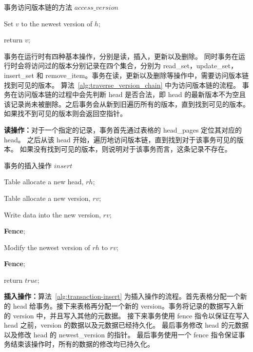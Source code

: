 \begin{algorithm}[ht]
    \caption{事务访问版本链的方法 $access\_version$}
    \label{alg:traverse_version_chain}
    \BlankLine

    Set $v$ to the newest version of $h$;


    return $v$;

\end{algorithm}

事务在运行时有四种基本操作，分别是读，插入，更新以及删除。
同时事务在运行时会将访问过的版本分别记录在四个集合，分别为 read\_set，update\_set，insert\_set 和 remove\_item。事务在读，更新以及删除等操作中，需要访问版本链找到可见的版本。
算法~\ref{alg:traverse_version_chain} 中为访问版本链的流程。
事务在访问版本链的过程中会先判断 head 是否合法，即 head 的最新版本不为空且该记录尚未被删除。之后事务会从新到旧遍历所有的版本，直到找到可见的版本。如果找不到可见的版本则会返回空指针。


\textbf{读操作：}对于一个指定的记录，事务首先通过表格的 head\_pages 定位其对应的 head。
之后从该 head 开始，遍历地访问版本链，直到找到对于该事务可见的版本。
如果没有找到可见的版本，则说明对于该事务而言，这条记录不存在。

\begin{algorithm}[h]
    \caption{事务的插入操作 $insert$}
    \label{alg:transaction-insert}
    \BlankLine
    Table allocate a new head, $rh$;

    Table allocate a new version, $rv$;

    Write data into the new version, $rv$;

    \textbf{Fence};

    Modify the newest version of $rh$ to $rv$;

    \textbf{Fence};

    return $true$;

\end{algorithm}

\textbf{插入操作：}算法~\ref{alg:transaction-insert} 为插入操作的流程。首先表格分配一个新的 head 给事务。接下来表格再分配一个新的 version。事务将记录的数据写入新的 version 中，并且写入其他的元数据。
接下来事务使用 fence 指令以保证在写入 head 之前，version 的数据以及元数据已经持久化。
最后事务修改 head 的元数据以及修改 head 的 newest\_version 的指针。
最后事务使用一个 fence 指令保证事务结束该操作时，所有的数据的修改均已持久化。



